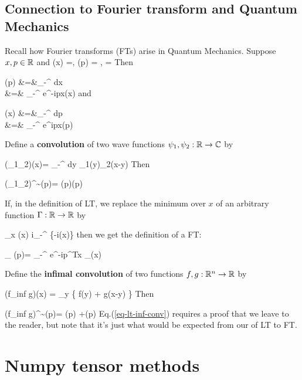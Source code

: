 \subsection{Connection to Fourier transform
and Quantum Mechanics}

Recall how Fourier transforms (FTs)
arise in Quantum Mechanics.
Suppose $x,p\in{ \mathbb{R}}$ and
\beq
\psi(x)
=,
\quad
\TIL{\psi}(p)
=
,\quad
{}=
\eeq
Then

\beqa
\TIL{\psi}(p)
&=&\int_{-\infty}^{\infty}
dx
\\
&=&
\int_{-\infty}^{\infty}
\;
e^{-ipx}\psi(x)
\eeqa
and

\beqa
\psi(x)
&=&\int_{-\infty}^{\infty}
 dp 
\\
&=&
\int_{-\infty}^{\infty}
\;
e^{ipx}\TIL{\psi}(p)
\eeqa

Define a {\bf convolution}
of two
wave functions $\psi_1,
\psi_2:{ \mathbb{R}}\rightarrow { \mathbb{C}}$
by


\beq
(\psi_1\circledast\psi_2)(x)=
\int_{-\infty}^{\infty}
dy\;
\psi_1(y)\psi_2(x-y)
\eeq
Then

\beq
(\psi_1\circledast\psi_2)^\sim(p)=
(p)(p)
\eeq

If, in the definition
of LT,
we replace the minimum
over $x$ of
an arbitrary function $\Gamma:{ \mathbb{R}}\rightarrow { \mathbb{R}}$
by

\beq
\min_x \Gamma(x)\rarrow
i\ln\int_{-\infty}^{\infty}
\exp\{-i\Gamma(x)\}
\eeq
then we get the
definition
of a FT:

\beq
{}_
{\TIL{\psi}(p)}=
\int_{-\infty}^{\infty}
\;
e^{-ip^Tx}
_{\psi(x)}
\eeq

Define the
{\bf infimal convolution}
of two functions
$f,g:{ \mathbb{R}}^n\rightarrow { \mathbb{R}}$ by

\beq
(f\circledast_{inf} g)(x)
=
\min_y \left\{
f(y) + g(x-y)
\right\}
\eeq
Then

\beq
(f\circledast_{inf} g)^\sim(p)=
(p) +(p)
\label{eq-lt-inf-conv}
\eeq
Eq.(\ref{eq-lt-inf-conv}) requires
a proof that we leave to the reader,
but note that it's just
what would be expected
from our  of
LT to FT.

\section{Numpy tensor methods}
\label{sec-numpy-tensors}

